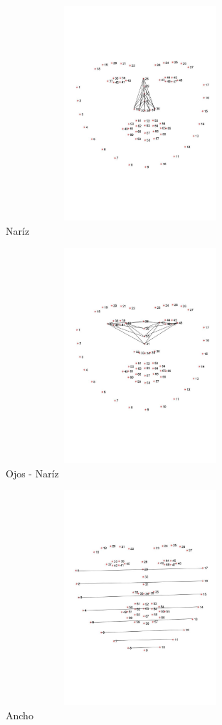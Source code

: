 \documentclass{article}
\begin{document}
\begin{figure}[H]
  \centering
  \includegraphics[width=100mm, height=80mm]{images/nasal_septum_distances.jpg}
  \caption{Naríz}
\end{figure}
  
\begin{figure}[H]
  \centering
  \includegraphics[width=100mm, height=80mm]{images/nose_distances.jpg}
  \caption{Ojos - Naríz}
\end{figure} 
  
\begin{figure}[H]
  \centering
  \includegraphics[width=100mm, height=80mm]{images/width_distances.jpg}
  \caption{Ancho}
\end{figure}
\end{document}

